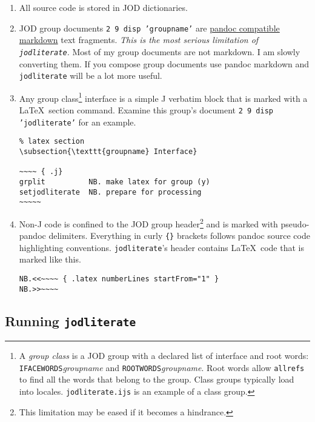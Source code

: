 \begin{enumerate}[1.]
\item
  All source code is stored in JOD dictionaries.
\item
  JOD group documents \texttt{2 9 disp 'groupname'} are
  \href{http://johnmacfarlane.net/pandoc/README.html\#pandocs-markdown}{pandoc
  compatible markdown} text fragments. \emph{This is the most serious
  limitation of \texttt{jodliterate}.} Most of my group documents are
  not markdown. I am slowly converting them. If you compose group
  documents use pandoc markdown and \texttt{jodliterate} will be a lot
  more useful.
\item
  Any group class\footnote{A \emph{group class} is a JOD group with a
    declared list of interface and root words:
    \texttt{IFACEWORDS}\emph{groupname} and
    \texttt{ROOTWORDS}\emph{groupname}. Root words allow
    \texttt{allrefs} to find all the words that belong to the group.
    Class groups typically load into locales. \texttt{jodliterate.ijs}
    is an example of a class group.} interface is a simple J verbatim
  block that is marked with a \LaTeX~section command. Examine this
  group's document \texttt{2 9 disp 'jodliterate'} for an example.

\begin{verbatim}
% latex section 
\subsection{\texttt{groupname} Interface}

~~~~ { .j}
grplit          NB. make latex for group (y)
setjodliterate  NB. prepare for processing
~~~~~  
\end{verbatim}
\item
  Non-J code is confined to the JOD group header\footnote{This
    limitation may be eased if it becomes a hindrance.} and is marked
  with pseudo-pandoc delimiters. Everything in curly \texttt{\{\}}
  brackets follows pandoc source code highlighting conventions.
  \texttt{jodliterate}'s header contains \LaTeX~code that is marked like
  this.

\begin{verbatim}
NB.<<~~~~ { .latex numberLines startFrom="1" }
NB.>>~~~~ 
\end{verbatim}
\end{enumerate}

\subsection{Running \texttt{jodliterate}}


